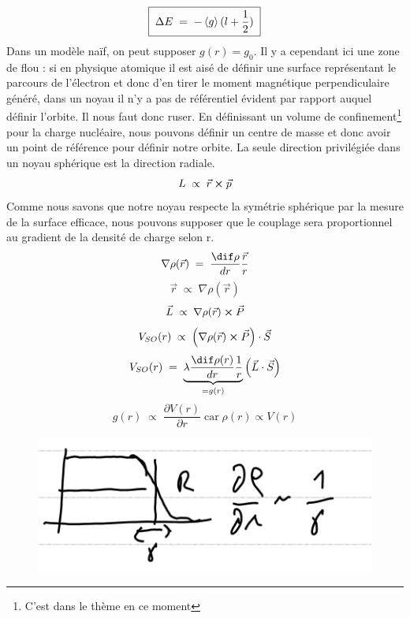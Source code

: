 \begin{equation*}
\boxed{
    \;\Delta E \; = \; -\expval{g}(l+\dfrac{1}{2})\;
    }
\end{equation*}
Dans un modèle naïf, on peut supposer $g(r) = g_0$.
Il y a cependant ici une zone de flou : si en physique atomique il est aisé de définir une surface représentant le parcours de l'électron et donc d'en tirer le moment magnétique perpendiculaire généré, dans un noyau il n'y a pas de référentiel évident par rapport auquel définir l'orbite. Il nous faut donc ruser. En définissant un volume de confinement\footnote{C'est dans le thème en ce moment} pour la charge nucléaire, nous pouvons définir un centre de masse et donc avoir un point de référence pour définir notre orbite. La seule direction privilégiée dans un noyau sphérique est la direction radiale.
\begin{equation*}
    L \; \propto\; \vec{r}\cross \vec{p}
\end{equation*}
Comme nous savons que notre noyau respecte la symétrie sphérique par la mesure de la surface efficace, nous pouvons supposer que le couplage sera proportionnel au gradient de la densité de charge selon r.
\begin{equation*}
    \nabla \rho(\vec{r}) \eq \dfrac{\dif\rho}{dr}\dfrac{\vec{r}}{r}
\end{equation*}
\begin{equation*}
    \vec{r} \; \propto \; \nabla \rho(\vec{r})
\end{equation*}
\begin{equation*}
    \vec{L}\;\propto\; \nabla \rho(\vec{r})\cross \vec{P}
\end{equation*}
\begin{equation*}
    V_{SO}(r) \; \propto \; \Big(\nabla \rho(\vec{r})\cross \vec{P}\Big)\cdot \vec{S}
\end{equation*}
\begin{equation*}
    V_{SO}(r) \eq\underbrace{  \lambda\dfrac{\dif\rho(r)}{dr}\dfrac{1}{r}}_{= g(r)}\Big(\vec{L}\cdot \vec{S}\Big)
\end{equation*}
\begin{equation*}
    g(r) \;\propto\; \dfrac{\partial V(r)}{\partial r} \; \text{car}\; \rho(r) \propto V(r)
\end{equation*}
\begin{figure}[H]
    \centering
    \includegraphics{Images4/facteur_gamma.PNG}
\end{figure}
